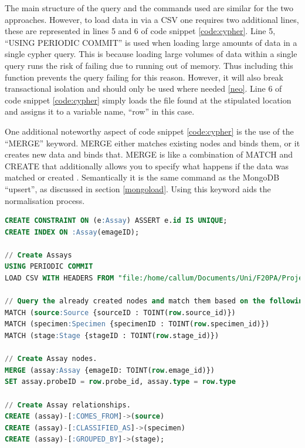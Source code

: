 The main structure of the query and the commands used are similar for the two approaches. However, to load data in via a CSV one requires two additional lines, these are represented in lines 5 and 6 of code snippet \ref{code:cypher}. Line 5, ``USING PERIODIC COMMIT'' is used when loading large amounts of data in a single cypher query. This is because loading large volumes of data within a single query runs the risk of failing due to running out of memory. Thus including this function prevents the query failing for this reason. However, it will also break transactional isolation and should only be used where needed \ref{neo}. Line 6 of code snippet \ref{code:cypher} simply loads the file found at the stipulated location and assigns it to a variable name, ``row'' in this case.

One additional noteworthy aspect of code snippet \ref{code:cypher} is the use of the ``MERGE'' keyword. MERGE either matches existing nodes and binds them, or it creates new data and binds that. MERGE is like a combination of MATCH and CREATE that additionally allows you to specify what happens if the data was matched or created \cite{neo}. Semantically it is the same command as the MongoDB ``upsert'', as discussed in section \ref{mongoload}. Using this keyword aids the normalisation process.
\newpage
\vspace*{\fill}
\begin{lstlisting}[language=SQL, caption=Cypher file created to load assay data into the Neo4j data model., label=code:cypher]
CREATE CONSTRAINT ON (e:Assay) ASSERT e.id IS UNIQUE;
CREATE INDEX ON :Assay(emageID);

// Create Assays
USING PERIODIC COMMIT
LOAD CSV WITH HEADERS FROM "file:/home/callum/Documents/Uni/F20PA/Project/Neo4j/Data/Assays.csv" AS row

// Query the already created nodes and match them based on the following clauses.
MATCH (source:Source {sourceID : TOINT(row.source_id)})
MATCH (specimen:Specimen {specimenID : TOINT(row.specimen_id)})
MATCH (stage:Stage {stageID : TOINT(row.stage_id)})

// Create Assay nodes.
MERGE (assay:Assay {emageID: TOINT(row.emage_id)})
SET assay.probeID = row.probe_id, assay.type = row.type

// Create Assay relationships.
CREATE (assay)-[:COMES_FROM]->(source)
CREATE (assay)-[:CLASSIFIED_AS]->(specimen)
CREATE (assay)-[:GROUPED_BY]->(stage);
\end{lstlisting}
\vspace*{\fill}
\newpage

